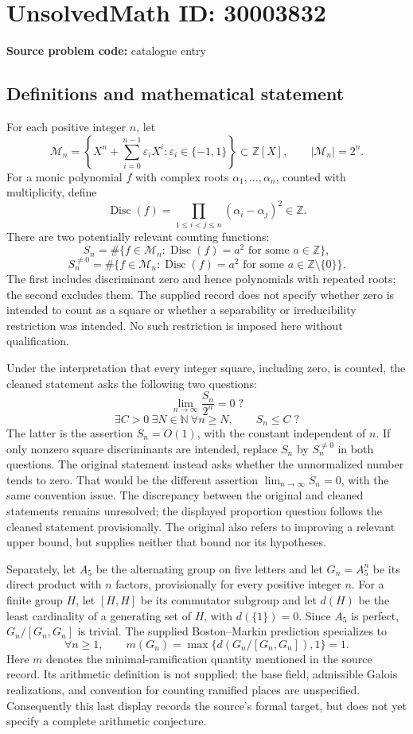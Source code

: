 \documentclass[11pt]{article}
\newcommand{\N}{\mathbb{N}}
\newcommand{\Z}{\mathbb{Z}}
\begin{document}
\section*{UnsolvedMath ID: 30003832}
\textbf{Source problem code:} catalogue entry
\subsection{Definitions and mathematical statement}
For each positive integer \(n\), let
\[
\mathcal M_n=\left\{X^n+\sum_{i=0}^{n-1}\varepsilon_iX^i:\varepsilon_i\in\{-1,1\}\right\}\subset\Z[X],
\qquad |\mathcal M_n|=2^n.
\]
For a monic polynomial \(f\) with complex roots \(\alpha_1,\ldots,\alpha_n\), counted with multiplicity, define
\[
\operatorname{Disc}(f)=\prod_{1\le i<j\le n}(\alpha_i-\alpha_j)^2\in\Z.
\]
There are two potentially relevant counting functions:
\[
S_n=\#\{f\in\mathcal M_n:\operatorname{Disc}(f)=a^2\text{ for some }a\in\Z\},
\]
\[
S_n^{\ne0}=\#\{f\in\mathcal M_n:\operatorname{Disc}(f)=a^2\text{ for some }a\in\Z\setminus\{0\}\}.
\]
The first includes discriminant zero and hence polynomials with repeated roots; the second excludes them. The supplied record does not specify whether zero is intended to count as a square or whether a separability or irreducibility restriction was intended. No such restriction is imposed here without qualification.

Under the interpretation that every integer square, including zero, is counted, the cleaned statement asks the following two questions:
\[
\lim_{n\to\infty}\frac{S_n}{2^n}=0\;?
\]
\[
\exists C>0\ \exists N\in\N\ \forall n\ge N,\qquad S_n\le C\;?
\]
The latter is the assertion \(S_n=O(1)\), with the constant independent of \(n\). If only nonzero square discriminants are intended, replace \(S_n\) by \(S_n^{\ne0}\) in both questions. The original statement instead asks whether the unnormalized number tends to zero. That would be the different assertion \(\lim_{n\to\infty}S_n=0\), with the same convention issue. The discrepancy between the original and cleaned statements remains unresolved; the displayed proportion question follows the cleaned statement provisionally. The original also refers to improving a relevant upper bound, but supplies neither that bound nor its hypotheses.

Separately, let \(A_5\) be the alternating group on five letters and let \(G_n=A_5^n\) be its direct product with \(n\) factors, provisionally for every positive integer \(n\). For a finite group \(H\), let \([H,H]\) be its commutator subgroup and let \(d(H)\) be the least cardinality of a generating set of \(H\), with \(d(\{1\})=0\). Since \(A_5\) is perfect, \(G_n/[G_n,G_n]\) is trivial. The supplied Boston--Markin prediction specializes to
\[
\forall n\ge1,\qquad m(G_n)=\max\{d(G_n/[G_n,G_n]),1\}=1.
\]
Here \(m\) denotes the minimal-ramification quantity mentioned in the source record. Its arithmetic definition is not supplied: the base field, admissible Galois realizations, and convention for counting ramified places are unspecified. Consequently this last display records the source's formal target, but does not yet specify a complete arithmetic conjecture.
\end{document}
